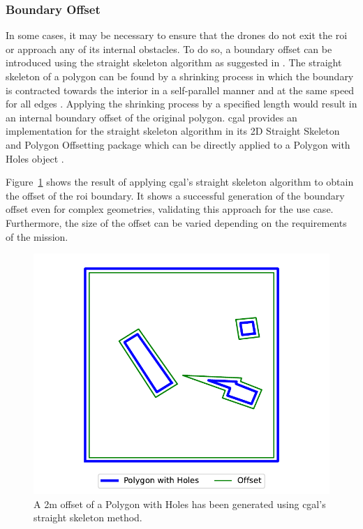 
\subsubsection{Boundary Offset}

In some cases, it may be necessary to ensure that the drones do not exit the \gls{roi} or approach any of its internal obstacles. To do so, a boundary offset can be introduced using the straight skeleton algorithm as suggested in \cite{shahid2024cpp}. The straight skeleton of a polygon can be found by a shrinking process in which the boundary is contracted towards the interior in a self-parallel manner and at the same speed for all edges \cite{aichholzer1996ss}. Applying the shrinking process by a specified length would result in an internal boundary offset of the original polygon. \gls{cgal} provides an implementation for the straight skeleton algorithm in its 2D Straight Skeleton and Polygon Offsetting package which can be directly applied to a Polygon with Holes object \cite{cgal2024ss}.

Figure~\ref{fig:msp_straight_skeleton} shows the result of applying \gls{cgal}'s straight skeleton algorithm to obtain the offset of the \gls{roi} boundary. It shows a successful generation of the boundary offset even for complex geometries, validating this approach for the use case. Furthermore, the size of the offset can be varied depending on the requirements of the mission. 

\begin{figure}[h!]
    \centering
    \includegraphics[width=0.6\linewidth]{figs/Jihwan/Polygon Offset with Straight Skeleton.pdf}
    \caption[Offset of ROI using Straight Skeleton]
    {A 2m offset of a Polygon with Holes has been generated using \gls{cgal}'s straight skeleton method.}
    \label{fig:msp_straight_skeleton}
\end{figure}

